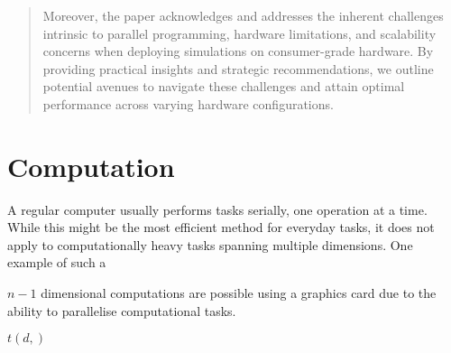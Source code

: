 \documentclass[]{report}
\begin{document}
\begin{abstract}
	Moreover, the paper acknowledges and addresses the inherent challenges intrinsic to parallel programming, hardware limitations, and scalability concerns when deploying simulations on consumer-grade hardware. By providing practical insights and strategic recommendations, we outline potential avenues to navigate these challenges and attain optimal performance across varying hardware configurations.
	
\end{abstract}

\section{Computation}
A regular computer usually performs tasks serially, one operation at a time. While this might be the most efficient method for everyday tasks, it does not apply to computationally heavy tasks spanning multiple dimensions.
One example of such a 



$n-1$ dimensional computations are possible using a graphics card due to the ability to parallelise computational tasks. 

$t(d,)$ 
\end{document}
